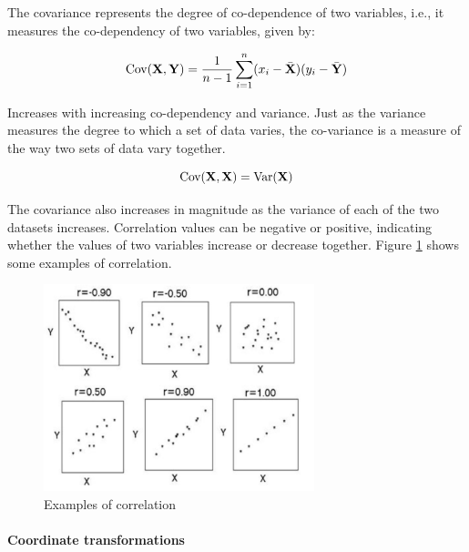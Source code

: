 \documentclass[11pt, oneside]{article}   	%
\begin{document}
The covariance represents the degree of co-dependence of two variables, i.e., it measures the co-dependency of two variables, given by:

\begin{equation}
   \text{Cov} ({\bf X}, {\bf Y}) = \frac{1}{n-1} \sum_{i=1}^{n} (x_i - \bar{ {\bf X}}) (y_i - \bar{ {\bf Y}})
\end{equation}

Increases with increasing co-dependency and variance. Just as the variance measures the degree to which a set of data varies, the co-variance is a measure of the way two sets of data vary together.

\begin{equation}
   \text{Cov} ({\bf X}, {\bf X}) = \text{Var}({\bf X})
\end{equation}

The covariance also increases in magnitude as the variance of each of the two datasets increases.
Correlation values can be negative or positive, indicating whether the values of two variables increase or decrease together. Figure \ref{fig:examples-correlation} shows some examples of correlation.

\begin{figure}[!ht]
	\centering
	\includegraphics[width=0.7\textwidth]{examples-correlation}
	\caption{Examples of correlation}
	\label{fig:examples-correlation}
\end{figure}



\paragraph{Coordinate transformations}
\paragraph{}
\end{document}
